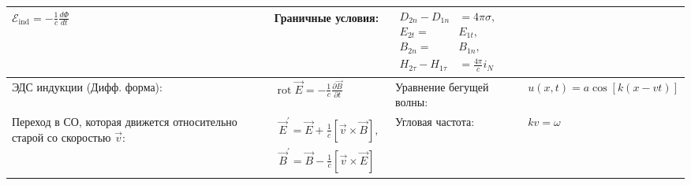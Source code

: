 \documentclass{article}
\begin{document}
\begin{tabular}{ |p{6cm}|p{3.5cm}|p{6cm}|p{3.5cm}|  }
$\mathcal{E}_{\mathrm{ind}}=-\frac{1}{c} \frac{d \Phi}{d t}$               &
Граничные условия:                                                         &
$\begin{aligned}
D_{2 n}-D_{1 n} &=4 \pi \sigma, \\
E_{2 t}=& E_{1 t}, \\
B_{2 n}=& B_{1 n}, \\
H_{2 \tau}-H_{1 \tau} &=\frac{4 \pi}{c} i_{N}
\end{aligned}$                                                             \\
\hline
ЭДС индукции (Дифф. форма):                                                &
$\operatorname{rot}\vec{E}=-\frac{1}{c} \frac{\partial \vec{B}}{\partial t}$ &
Уравнение бегущей волны:                                                   &
$u(x, t)=a \cos [k(x-v t)]$                                                \\
\hline
Переход в СО, которая движется относительно старой со скоростью $\vec{v}$: &
$\begin{aligned}
\vec{E}^{\prime}=\vec{E}+\frac{1}{c} [\vec{v} \times \vec{B}], \\
\vec{B}^{\prime}=\vec{B}-\frac{1}{c} [\vec{v} \times \vec{E}]
\end{aligned}$                                                             &
Угловая частота:                                                           &
$k v=\omega$                                                               \\
\hline
\end{tabular}

\newpage
\end{document}
